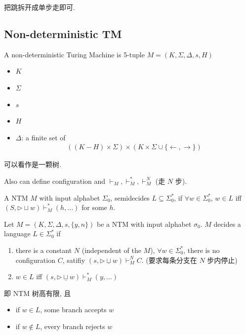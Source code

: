 把跳拆开成单步走即可. 

\subsection{Non-deterministic TM}
\begin{definition}
    A non-deterministic Turing Machine is 5-tuple $M=(K, \Sigma, \Delta, s, H)$
    \begin{itemize}
        \item $K$
        \item $\Sigma$
        \item $s$
        \item $H$
        \item $\Delta$: a finite set of 
        \begin{align*}
            ((K-H)\times \Sigma)\times (K\times \Sigma \cup \{ \leftarrow , \rightarrow \})
        \end{align*}
    \end{itemize}
\end{definition}
可以看作是一颗树. 

Also can define configuration and $\vdash_M, \vdash_M^*, \vdash_M^N$ (走 $N$ 步). 

\begin{definition}
    A NTM $M$ with input alphabet $\Sigma_0$, semidecides $L\subseteq \Sigma_0^*$, if $\forall w \in \Sigma_0^*$, $w\in L$ iff $(S, \triangleright \sqcup w)\vdash^*_M (h,\dots)$ for some $h$. 
\end{definition}

\begin{definition}
    Let $M=(K, \Sigma, \Delta, s, \{ y,n \})$ be a NTM with input alphabet $\sigma_0$. $M$ decides a language $L\in \Sigma_0^*$ if 
    \begin{enumerate}
        \item there is a constant $N$ (independent of the $M$), $\forall w\in \Sigma_0^*$, there is no configuration $C$, satifiy $(s,\triangleright \underline{\sqcup} w)\vdash_M^N C$. (要求每条分支在 $N$ 步内停止)
        \item $w\in L$ iff $(s,\triangleright \underline{\sqcup} w)\vdash_M^*(y,\dots)$
    \end{enumerate}
\end{definition}
即 NTM 树高有限, 且
\begin{itemize}
    \item if $w\in L$, some branch accepts $w$
    \item if $w\notin L$, every branch rejects $w$
\end{itemize}

